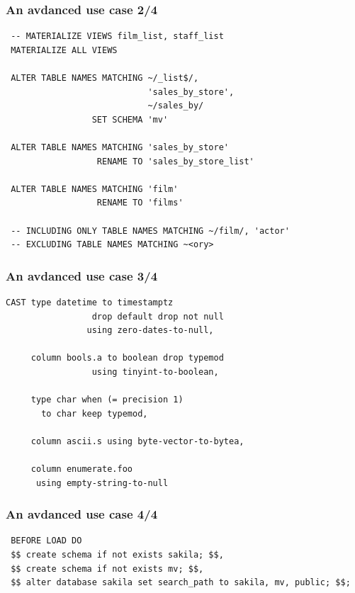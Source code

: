 \documentclass{beamer}
\begin{document}
\begin{frame}[fragile]
  \frametitle{An avdanced use case 2/4}

\begin{verbatim}
 -- MATERIALIZE VIEWS film_list, staff_list
 MATERIALIZE ALL VIEWS

 ALTER TABLE NAMES MATCHING ~/_list$/,
                            'sales_by_store',
                            ~/sales_by/
                 SET SCHEMA 'mv'

 ALTER TABLE NAMES MATCHING 'sales_by_store'
                  RENAME TO 'sales_by_store_list'

 ALTER TABLE NAMES MATCHING 'film'
                  RENAME TO 'films'

 -- INCLUDING ONLY TABLE NAMES MATCHING ~/film/, 'actor'
 -- EXCLUDING TABLE NAMES MATCHING ~<ory>
\end{verbatim}
\end{frame}

\begin{frame}[fragile]
  \frametitle{An avdanced use case 3/4}

\begin{verbatim}
CAST type datetime to timestamptz
                 drop default drop not null
                using zero-dates-to-null,

     column bools.a to boolean drop typemod
                 using tinyint-to-boolean,

     type char when (= precision 1)
       to char keep typemod,

     column ascii.s using byte-vector-to-bytea,

     column enumerate.foo
      using empty-string-to-null
\end{verbatim}
\end{frame}

\begin{frame}[fragile]
  \frametitle{An avdanced use case 4/4}

\begin{verbatim}
 BEFORE LOAD DO
 $$ create schema if not exists sakila; $$,
 $$ create schema if not exists mv; $$,
 $$ alter database sakila set search_path to sakila, mv, public; $$;
\end{verbatim}
\end{frame}
\end{document}
